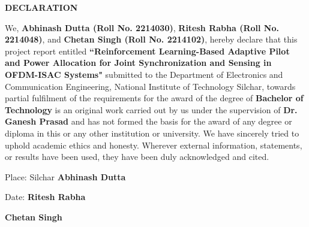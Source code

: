 \setcounter{page}{2}
\begin{center}
{\Large{\bf{DECLARATION}}}
\end{center}

\noindent
We, \textbf{Abhinash Dutta (Roll No. 2214030)}, \textbf{Ritesh Rabha (Roll No. 2214048)}, and \textbf{Chetan Singh (Roll No. 2214102)}, hereby declare that this project report entitled \textbf{``Reinforcement Learning-Based Adaptive Pilot and Power Allocation for Joint Synchronization and Sensing in OFDM-ISAC Systems"} submitted to the Department of Electronics and Communication Engineering, National Institute of Technology Silchar, towards partial fulfilment of the requirements for the award of the degree of \textbf{Bachelor of Technology} is an original work carried out by us under the supervision of \textbf{Dr. Ganesh Prasad} and has not formed the basis for the award of any degree or diploma in this or any other institution or university. We have sincerely tried to uphold academic ethics and honesty. Wherever external information, statements, or results have been used, they have been duly acknowledged and cited.

\vspace{4cm}

\noindent Place: Silchar \hfill \textbf{Abhinash Dutta}

\noindent Date: \hfill \textbf{Ritesh Rabha}

\noindent \hfill \textbf{Chetan Singh}

\clearpage
